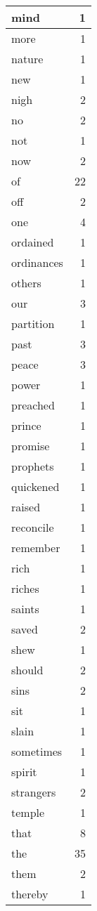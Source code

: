 \begin{center}
\begin{longtable}{l|r}
mind & 1\\ \hline 
more & 1\\ \hline 
nature & 1\\ \hline 
new & 1\\ \hline 
nigh & 2\\ \hline 
no & 2\\ \hline 
not & 1\\ \hline 
now & 2\\ \hline 
of & 22\\ \hline 
off & 2\\ \hline 
one & 4\\ \hline 
ordained & 1\\ \hline 
ordinances & 1\\ \hline 
others & 1\\ \hline 
our & 3\\ \hline 
partition & 1\\ \hline 
past & 3\\ \hline 
peace & 3\\ \hline 
power & 1\\ \hline 
preached & 1\\ \hline 
prince & 1\\ \hline 
promise & 1\\ \hline 
prophets & 1\\ \hline 
quickened & 1\\ \hline 
raised & 1\\ \hline 
reconcile & 1\\ \hline 
remember & 1\\ \hline 
rich & 1\\ \hline 
riches & 1\\ \hline 
saints & 1\\ \hline 
saved & 2\\ \hline 
shew & 1\\ \hline 
should & 2\\ \hline 
sins & 2\\ \hline 
sit & 1\\ \hline 
slain & 1\\ \hline 
sometimes & 1\\ \hline 
spirit & 1\\ \hline 
strangers & 2\\ \hline 
temple & 1\\ \hline 
that & 8\\ \hline 
the & 35\\ \hline 
them & 2\\ \hline 
thereby & 1\\ \hline 

\end{longtable}
\end{center}
